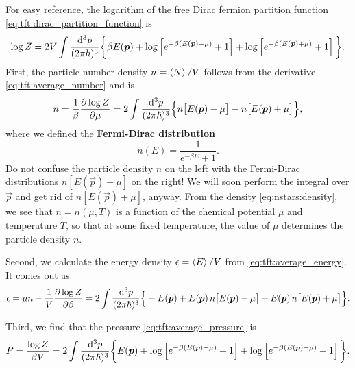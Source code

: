 For easy reference, the logarithm of the free Dirac fermion partition function \eqref{eq:tft:dirac_partition_function} is
\begin{equation}
	\log Z = 2 V \int \frac{\mathop{}\!\mathrm{d}^3 p}{(2 \pi \hbar)^3} \bigg\{ \beta E({\bm{p}}) + \log \left[ e^{-\beta (E({\bm{p}}) - \mu)}+1 \right] + \log \left[ e^{-\beta (E({\bm{p}}) + \mu)} + 1\right] \bigg\}.
\end{equation}
First, the particle number density $n = \left< N \right>/V$ follows from the derivative \eqref{eq:tft:average_number} and is
\begin{equation}
	n = 
	\frac{1}{\beta} \pdv{\log Z}{\mu} =
	2 \int \frac{\mathop{}\!\mathrm{d}^3 p}{(2 \pi \hbar)^3} \Big\{ n\big[ E({\bm{p}})-\mu \big] - n\big[ E({\bm{p}})+\mu \big] \Big\} ,
\label{eq:nstars:density}
\end{equation}
where we defined the \textbf{Fermi-Dirac distribution}
\begin{equation}
	n(E) = \frac{1}{e^{-\beta E} + 1}.
\label{eq:nstars:fermi_dirac_distribution}
\end{equation}
Do not confuse the particle density $n$ on the left with the Fermi-Dirac distributions $n[E(\vec{p}) \mp \mu]$ on the right!
We will soon perform the integral over $\vec{p}$ and get rid of $n[E(\vec{p}) \mp \mu]$, anyway.
From the density \eqref{eq:nstars:density}, we see that $n = n(\mu, T)$ is a function of the chemical potential $\mu$ and temperature $T$, so that at some fixed temperature, the value of $\mu$ determines the particle density $n$.

Second, we calculate the energy density $\epsilon = \left< E \right> / V$ from \cref{eq:tft:average_energy}.
It comes out as 
\begin{equation}
	\epsilon = 
	\mu n - \frac{1}{V} \pdv{\log Z}{\beta} =
	2 \int \frac{\mathop{}\!\mathrm{d}^3 p}{(2 \pi \hbar)^3} \Big\{ -E({\bm{p}}) + E({\bm{p}}) \, n\big[ E({\bm{p}})-\mu \big] + E({\bm{p}}) \, n\big[ E({\bm{p}})+\mu \big] \Big\}.
\label{eq:nstars:energy_density}
\end{equation}

Third, we find that the pressure \eqref{eq:tft:average_pressure} is
\begin{equation}
	P =
	\frac{\log Z}{\beta V} = 
	2 \int \frac{\mathop{}\!\mathrm{d}^3 p}{(2 \pi \hbar)^3} \bigg\{ E({\bm{p}}) + \log \left[ e^{-\beta(E({\bm{p}})-\mu)} + 1 \right] + \log \left[ e^{-\beta(E({\bm{p}})+\mu)} + 1 \right] \bigg\}.
\label{eq:nstars:pressure}
\end{equation}

